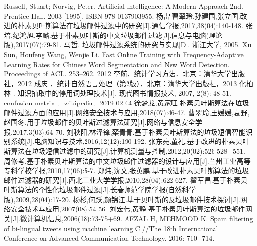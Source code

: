 \documentclass[UTF8]{ctexart}
\begin{document}
\begin{thebibliography}{99}
	Russell, Stuart; Norvig, Peter. Artificial Intelligence: A Modern Approach 2nd. Prentice Hall. 2003 [1995]. ISBN 978-0137903955.
	杨雷,曹翠玲,孙建国,张立国.改进的朴素贝叶斯算法在垃圾邮件过滤中的研究[J].通信学报,2017,38(04):140-148.
	张培,纪鸿旭,李璐.基于朴素贝叶斯的中文垃圾邮件过滤[J].信息与电脑(理论版),2017(07):79-81.
	马哲. 垃圾邮件过滤系统的研究与实现[D]. 浙江大学, 2005.
	Xu Sun, Houfeng Wang, Wenjie Li. Fast Online Training with Frequency-Adaptive Learning Rates for Chinese Word Segmentation and New Word Detection. Proceedings of ACL. 253–262. 2012
	李航．统计学习方法．北京：清华大学出版社，2012
	成庆 ．统计自然语言处理（第2版）．北京：清华大学出版社，2013
	化柏林	. 知识抽取中的停用词处理技术[J]. 现代图书情报技术, 2007, 2(8): 48-51.	
	confusion matrix  ．wikipedia．2019-02-04
	徐梦龙,黄家旺.朴素贝叶斯算法在垃圾邮件过滤方面的应用[J].网络安全技术与应用,2018(07):46-47.
	曹翠玲,王媛媛,袁野,赵国冬.用于垃圾邮件的贝叶斯过滤算法研究[J].网络与信息安全学报,2017,3(03):64-70.
	刘秋阳,林泽锋,栾青青.基于朴素贝叶斯算法的垃圾短信智能识别系统[J].电脑知识与技术,2016,12(12):190-192.
	张东亮,董礼.基于改进的朴素贝叶斯算法在垃圾短信过滤中的研究[J].计算机测量与控制,2012,20(02):526-528+551.
	周修考.基于朴素贝叶斯算法的中文垃圾邮件过滤器的设计与应用[J].兰州工业高等专科学校学报,2010,17(06):5-7.
	郑炜,沈文,张英鹏.基于改进朴素贝叶斯算法的垃圾邮件过滤器的研究[J].西北工业大学学报,2010,28(04):622-627.
	翟军昌.基于朴素贝叶斯算法的个性化垃圾邮件过滤[J].长春师范学院学报(自然科学版),2009,28(04):17-20.
	杨杉,何跃,颜锦江.基于贝叶斯的反垃圾邮件技术探讨[J].网络安全技术与应用,2007(08):54-56.
	刘宏伟,黄静.基于朴素贝叶斯算法的垃圾邮件网关[J].微计算机信息,2006(18):73-75+69.
	AFZAL H, MEHMOOD K. Spam filtering of bi-lingual tweets using machine learning[C]//The 18th International Conference on Advanced Communication Technology. 2016: 710- 714.
\end{thebibliography}
\end{document}
